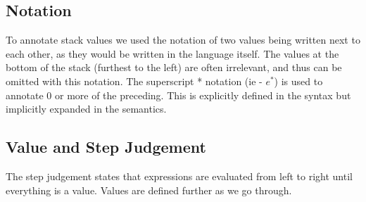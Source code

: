 \documentclass{article}
\begin{document}
\subsection{Notation}
To annotate stack values we used the notation of two values being written next to each other, as they would be written in the language itself. The values at the bottom of the stack (furthest to the left) are often irrelevant, and thus can be omitted with this notation. The superscript * notation (ie - $e^*$) is used to annotate 0 or more of the preceding. This is explicitly defined in the syntax but implicitly expanded in the semantics.

\subsection{Value and Step Judgement}
The step judgement states that expressions are evaluated from left to right until everything is a value. Values are defined further as we go through.
{
    \centering
    \def \MathparLineskip {\lineskip=0.43cm}
}
\end{document}
